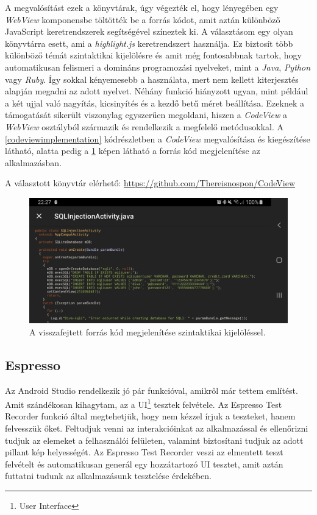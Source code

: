 \documentclass{thesis-ekf}
\theoremstyle{definition}
\theoremstyle{remark}
\begin{document}
A megvalósítást ezek a könyvtárak, úgy végezték el, hogy lényegében egy \emph{WebView} komponensbe töltötték be a forrás kódot, amit aztán különböző JavaScript keretrendszerek segítségével színeztek ki.
A választásom egy olyan könyvtárra esett, ami a \emph{highlight.js} keretrendszert használja.
Ez biztosít több különböző témát szintaktikai kijelölésre és amit még fontosabbnak tartok, hogy automatikusan felismeri a domináns programozási nyelveket, mint a \emph{Java}, \emph{Python} vagy \emph{Ruby}.
Így sokkal kényemesebb a használata, mert nem kellett kiterjesztés alapján megadni az adott nyelvet.
Néhány funkció hiányzott ugyan, mint például a két ujjal való nagyítás, kicsinyítés és a kezdő betű méret beállítása.
Ezeknek a támogatását sikerült viszonylag egyszerűen megoldani, hiszen a \emph{CodeView} a \emph{WebView} osztályból származik és rendelkezik a megfelelő metódusokkal.
A \ref{codeviewimplementation} kódrészletben a \emph{CodeView} megvalósítása és kiegészítése látható, alatta pedig a \ref{codeview} képen látható a forrás kód megjelenítése az alkalmazásban.

A választott könyvtár elérhető: \url{https://github.com/Thereisnospon/CodeView}



\begin{figure}[!h]
	\centering
	\includegraphics[width=15cm]{pictures/codeview}
	\caption{A visszafejtett forrás kód megjelenítése szintaktikai kijelöléssel.}
	\label{codeview}
\end{figure}

\subsection{Espresso}

Az Android Studio rendelkezik jó pár funkcióval, amikről már tettem említést.
Amit szándékosan kihagytam, az a UI\footnote{User Interface} tesztek felvétele.
Az Espresso Test Recorder funkció által megtehetjük, hogy nem kézzel írjuk a teszteket, hanem felvesszük őket.
Feltudjuk venni az interakcióinkat az alkalmazással és ellenőrizni tudjuk az elemeket a felhasználói felületen, valamint biztosítani tudjuk az adott pillant kép helyességét.
Az Espresso Test Recorder veszi az elmentett teszt felvételt és automatikusan generál egy hozzátartozó UI tesztet, amit aztán futtatni tudunk az alkalmazásunk tesztelése érdekében.
\end{document}
